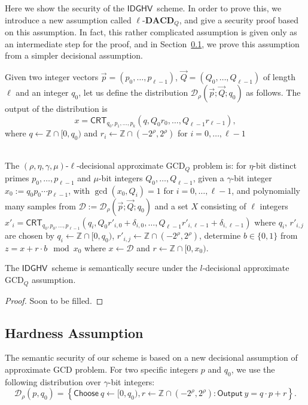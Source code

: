 \documentclass[11pt]{llncs}
\newcommand{\Z}{{\mathbb Z}}
\newcommand*\Choose{\ensuremath{\mathsf{Choose}\ }}
\newcommand*\Output{\ensuremath{\mathsf{Output}\ }}
\newcommand*{\crt}{\ensuremath{\mathsf{CRT}}}
\newcommand*{\CDGHV}{\ensuremath{\mathsf{IDGHV}}}
\newcommand*\D{\ensuremath{\mathcal D}}
\begin{document}
Here we show the security of the \CDGHV\ scheme.  In order to prove this, we introduce a new assumption called $\ell$-$\mathbf{DACD}_Q$, and give a security proof based on this assumption.  In fact, this rather complicated assumption is given only as an intermediate step for the proof, and in Section~\ref{decisional_assumption}, we prove this assumption from a simpler decisional assumption.

Given two integer vectors $\vec{p}=(p_0, \dots, p_{\ell-1})$, $\vec{Q}=(Q_0, \dots, Q_{\ell-1})$ of length $\ell$ and an integer $q_0$, let us define the distribution $\D_\rho(\vec{p}; \vec{Q}; q_0)$ as follows.  The output of the distribution is
\[
x=\crt_{q_0,p_1,\dots,p_k}(q,Q_0r_0,\dots,Q_{\ell-1}r_{\ell-1}),
\]
where $q\gets\Z\cap[0,q_0)$ and $r_i\gets\Z\cap(-2^\rho,2^\rho)$ for $i=0,\dots,\ell-1$

\begin{definition} \\
The $(\rho,\eta,\gamma,\mu)$-$\ell$-decisional approximate GCD$_Q$ problem is: for $\eta$-bit distinct primes $p_0,\dots,p_{\ell-1}$ and $\mu$-bit integers $Q_0,\dots,Q_{\ell-1}$, given a $\gamma$-bit integer  $x_0:=q_0p_0\cdots p_{\ell-1}$, with $\gcd(x_0,Q_i)=1$ for $i=0,\dots,\ell-1$, and  %
polynomially many samples from $\D:=\D_{\rho}(\vec{p};\vec{Q};q_0)$ and a set $X$ consisting of $\ell$ integers $x'_i=\crt_{q_0,p_0,\dots,p_{\ell-1}}(q_i,Q_0r'_{i,0}+\delta_{i,0},\dots,Q_{\ell-1}r'_{i,\ell-1}+\delta_{i,\ell-1})$ where $q_i$, $r'_{i,j}$ are chosen by
$q_i\gets\Z\cap[0,q_0)$, $r'_{i,j}\gets\Z\cap(-2^\rho,2^\rho)$, determine $b\in\{0,1\}$ from $z=x+r\cdot b\mod x_0$ where $x\gets\D$ and $r\gets\Z\cap[0,x_0)$.
\end{definition}

\begin{theorem}
The \CDGHV\ scheme is semantically secure under the $l$-decisional approximate $\mathrm{GCD}_Q$ assumption.
\end{theorem}
\begin{proof}
Soon to be filled.
\end{proof}

\subsection{Hardness Assumption}\label{decisional_assumption}
The semantic security of our scheme is based on a new decisional assumption of approximate GCD problem. 
 For two specific
integers $p$ and $q_0$, we use the following distribution over
$\gamma$-bit integers:  
\[ \D_\rho(p,q_0) = \left\{ \Choose q\gets [0, q_0),
  r\gets \Z\cap (-2^\rho, 2^\rho) : \Output y=q\cdot p+r
  \right\}. \] 
\end{document}
